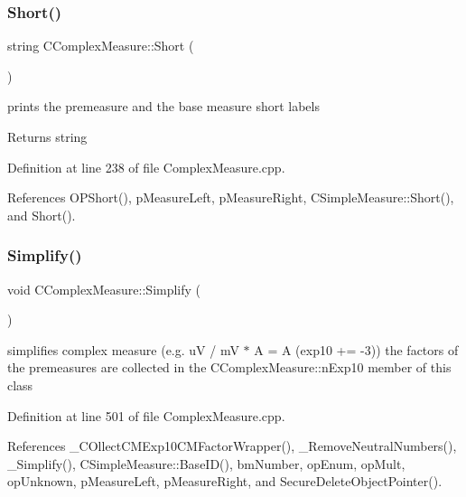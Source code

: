 \mbox{\label{classCComplexMeasure_a771c7c8e73b3c67803ee2c77d8a40187}} 
\subsubsection{\texorpdfstring{Short()}{Short()}}
{\footnotesize\ttfamily string C\+Complex\+Measure\+::\+Short (\begin{DoxyParamCaption}{ }\end{DoxyParamCaption})}



prints the premeasure and the base measure short labels 

\begin{DoxyReturn}{Returns}
string 
\end{DoxyReturn}


Definition at line 238 of file Complex\+Measure.\+cpp.



References O\+P\+Short(), p\+Measure\+Left, p\+Measure\+Right, C\+Simple\+Measure\+::\+Short(), and Short().

\mbox{\label{classCComplexMeasure_addb4e69033f2c32fb3bf4a3aef5e1470}} 
\subsubsection{\texorpdfstring{Simplify()}{Simplify()}}
{\footnotesize\ttfamily void C\+Complex\+Measure\+::\+Simplify (\begin{DoxyParamCaption}{ }\end{DoxyParamCaption})}



simplifies complex measure (e.\+g. uV / mV $\ast$ A = A (exp10 += -\/3)) the factors of the premeasures are collected in the C\+Complex\+Measure\+::n\+Exp10 member of this class 



Definition at line 501 of file Complex\+Measure.\+cpp.



References \+\_\+\+C\+Ollect\+C\+M\+Exp10\+C\+M\+Factor\+Wrapper(), \+\_\+\+Remove\+Neutral\+Numbers(), \+\_\+\+Simplify(), C\+Simple\+Measure\+::\+Base\+I\+D(), bm\+Number, op\+Enum, op\+Mult, op\+Unknown, p\+Measure\+Left, p\+Measure\+Right, and Secure\+Delete\+Object\+Pointer().

